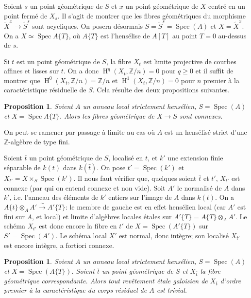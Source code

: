 \documentclass{book}
\DeclareMathOperator{\h}{H}
\DeclareMathOperator{\spec}{Spec}
\newcommand{\dZ}{\mathbb{Z}}
\newcommand{\iso}{\xrightarrow\sim}
\newtheorem{proposition}[subsubsection]{Proposition}
\begin{document}
Soient $s$ un point géométrique de $S$ et $x$ un point géométrique de 
$X$ centré en un point fermé de $X_s$. Il s'agit de montrer que les fibres 
géométriques du morphisme $\widetilde X^x\to \widetilde S^s$ sont 
acycliques. On posera désormais $S=\widetilde S^s=\spec(A)$ et 
$X=\widetilde X^x$. On a $X\simeq \spec A\{T\}$, où $A\{T\}$ est l'hensélise 
de $A[T]$ au point $T=0$ au-dessus de $s$. 

Si $t$ est un point géométrique de $S$, la fibre $X_t$ est limite 
projective de courbes affines et lisses sur $t$. On a donc $\h^q(X_t,\dZ/n) = 0$ 
pour $q\geqslant 0$ et il suffit de montrer que $\h^0(X_t,\dZ/n) = \dZ/n$ et 
$\h^1(X_t,\dZ/n) = 0$ pour $n$ premier à la caractéristique résiduelle de 
$S$. Cela résulte des deux propositions suivantes. 





\begin{proposition}\label{I:5-2-2}
Soient $A$ un anneau local strictement hensélien, $S=\spec(A)$ et 
$X=\spec A\{T\}$. Alors les fibres géométrique de $X\to S$ sont connexes. 
\end{proposition}

On peut se ramener par passage à limite au cas où $A$ est un hensélisé 
strict d'une $\dZ$-algèbre de type fini. 

Soient $\bar t$ un point géométrique de $S$, localisé en $t$, et $k'$ une 
extension finie séparable de $k(t)$ dans $k(\bar t)$. On pose $t'=\spec(k')$ 
et $X_{t'} = X\times_S\spec(k')$. Il nous faut vérifier que, quelques soient 
$\bar t$ et $t'$, $X_{t'}$ est connexe (par qui on entend connexe et non vide). 
Soit $A'$ le normalisé de $A$ dans $k'$, i.e. l'anneau des éléments de 
$k'$ entiers sur l'image de $A$ dans $k(t)$. On a 
$A\{t\}\otimes_A A'\iso A'\{T\}$: le membre de gauche est en effet hensélien 
local (car $A'$ est fini sur $A$, et local) et limite d'algèbres locales 
étales sur $A'\{T\}=A\{T\}\otimes_A A'$. Le schéma $X_{t'}$ est donc encore 
la fibre en $t'$ de $X=\spec\left(A'\{T\}\right)$ sur $S'=\spec(A')$. Le 
schéma local $X'$ est normal, donc intègre; son localisé $X_{t'}$ est 
encore intègre, a fortiori connexe. 





\begin{proposition}\label{I:5-2-3}
Soient $A$ un anneau local strictement hensélien, $S=\spec(A)$ et 
$X=\spec\left(A\{T\}\right)$. Soient $\bar t$ un point géométrique de $S$ 
et $X_{\bar t}$ la fibre géométrique correspondante. Alors tout revêtement 
étale galoisien de $X_{\bar t}$ d'ordre premier à la caractéristique du 
corps résiduel de $A$ est trivial. 
\end{proposition}
\end{document}
